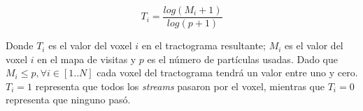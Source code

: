 \begin{equation}
\label{eq:normalizacion}
T_i = \frac{ log(M_i + 1)}{log(p+1)}
\end{equation}

Donde $T_i$ es el valor del voxel $i$ en el tractograma resultante; $M_i$
es el valor del voxel $i$ en el mapa de visitas y $p$ es el n\'umero de 
part\'iculas usadas. Dado que $M_i \leq p, \forall i \in [1..N]$ cada voxel
del tractograma tendr\'a un valor entre uno y cero. $T_i = 1$ representa que
todos los \textit{streams} pasaron por el voxel, mientras que $T_i = 0$
representa que ninguno pas\'o. \\
